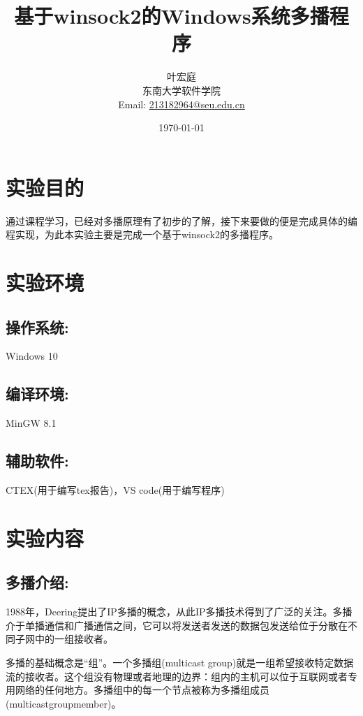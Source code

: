 \documentclass[UTF8]{ctexart}
\author{\small{\kaishu 71118415 叶宏庭}\\[2pt]
\small{\kaishu 东南大学软件学院}\\[2pt]
\small{Email:}
\url{213182964@seu.edu.cn}
}
\title{\Huge{\heiti 基于winsock2的Windows系统多播程序}}
\date{\today} %
\begin{document}
\maketitle

\section{实验目的}{通过课程学习，已经对多播原理有了初步的了解，接下来要做的便是完成具体的编程实现，为此本实验主要是完成一个基于winsock2的多播程序。}

\section{实验环境}
\subsection{操作系统:}{Windows 10}
\subsection{编译环境:}{MinGW 8.1}
\subsection{辅助软件:}{CTEX(用于编写tex报告)，VS code(用于编写程序)}
\section{实验内容}
\subsection{多播介绍:}{1988年，Deering提出了IP多播的概念，从此IP多播技术得到了广泛的关注。多播介于单播通信和广播通信之间，它可以将发送者发送的数据包发送给位于分散在不同子网中的一组接收者。
}
\par{多播的基础概念是“组”。一个多播组(multicast group)就是一组希望接收特定数据流的接收者。这个组没有物理或者地理的边界：组内的主机可以位于互联网或者专用网络的任何地方。多播组中的每一个节点被称为多播组成员(multicastgroupmember)。
}
\end{document}
